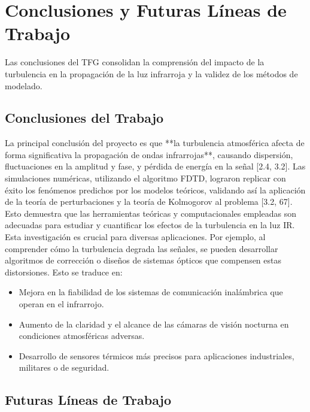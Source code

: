 \section{Conclusiones y Futuras Líneas de Trabajo} Las conclusiones del TFG consolidan la comprensión del impacto de la turbulencia en la propagación de la luz infrarroja y la validez de los métodos de modelado. 

\subsection{Conclusiones del Trabajo} La principal conclusión del proyecto es que **la turbulencia atmosférica afecta de forma significativa la propagación de ondas infrarrojas**, causando dispersión, fluctuaciones en la amplitud y fase, y pérdida de energía en la señal [2.4, 3.2]. Las simulaciones numéricas, utilizando el algoritmo FDTD, lograron replicar con éxito los fenómenos predichos por los modelos teóricos, validando así la aplicación de la teoría de perturbaciones y la teoría de Kolmogorov al problema [3.2, 67]. Esto demuestra que las herramientas teóricas y computacionales empleadas son adecuadas para estudiar y cuantificar los efectos de la turbulencia en la luz IR. Esta investigación es crucial para diversas aplicaciones. Por ejemplo, al comprender cómo la turbulencia degrada las señales, se pueden desarrollar algoritmos de corrección o diseños de sistemas ópticos que compensen estas distorsiones. Esto se traduce en: 

\begin{itemize}[noitemsep,topsep=0pt] 
    \item Mejora en la fiabilidad de los sistemas de comunicación inalámbrica que operan en el infrarrojo. 
    \item Aumento de la claridad y el alcance de las cámaras de visión nocturna en condiciones atmosféricas adversas. 
    \item Desarrollo de sensores térmicos más precisos para aplicaciones industriales, militares o de seguridad. 
\end{itemize} 

\subsection{Futuras Líneas de Trabajo} 

